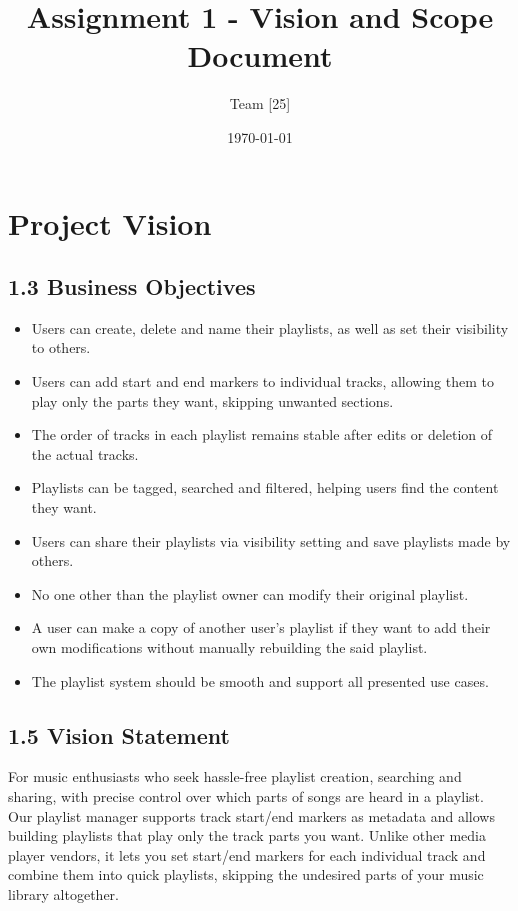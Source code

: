 \documentclass{article}
\title{Assignment 1 - Vision and Scope Document}
\author{Team [25]}
\date{\today}
\begin{document}
\maketitle

\section{Project Vision}

\subsection{1.3 Business Objectives}
\begin{itemize}
    \item Users can create, delete and name their playlists, as well as set their visibility to others.
    \item Users can add start and end markers to individual tracks, allowing them to play only the parts they want, skipping unwanted sections.
    \item The order of tracks in each playlist remains stable after edits or deletion of the actual tracks.
    \item Playlists can be tagged, searched and filtered, helping users find the content they want.
    \item Users can share their playlists via visibility setting and save playlists made by others.
    \item No one other than the playlist owner can modify their original playlist.
    \item A user can make a copy of another user's playlist if they want to add their own modifications without manually rebuilding the said playlist.
    \item The playlist system should be smooth and support all presented use cases.
\end{itemize}

\subsection{1.5 Vision Statement} 
For music enthusiasts who seek hassle-free playlist creation, searching and sharing, with precise control over which parts of songs are heard in a playlist. Our playlist manager supports track start/end markers as metadata and allows building playlists that play only the track parts you want. Unlike other media player vendors, it lets you set start/end markers for each individual track and combine them into quick playlists, skipping the undesired parts of your music library altogether.
\end{document}
